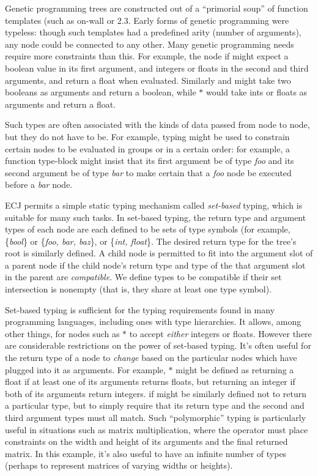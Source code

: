 \documentclass[twoside,10pt]{book}
\newcommand\lisp[1]{\textsf{#1}}
\begin{document}
Genetic programming trees are constructed out of a ``primorial soup'' of function templates (such as \lisp{on-wall} or \lisp{2.3}.  Early forms of genetic programming were typeless: though such templates had a predefined arity (number of arguments), any node could be connected to any other.  Many genetic programming needs require more constraints than this.  For example, the node \lisp{if} might expect a boolean value in its first argument, and integers or floats in the second and third arguments, and return a float when evaluated.  Similarly \lisp{and} might take two booleans as arguments and return a boolean, while \lisp{\(\ast\)} would take ints or floats as arguments and return a float.

Such types are often associated with the kinds of data passed from node to node, but they do not have to be.  For example, typing might be used to constrain certain nodes to be evaluated in groups or in a certain order: for example, a function \lisp{type-block} might insist that its first argument be of type \textit{foo} and its second argument be of type \textit{bar} to make certain that a \textit{foo} node be executed before a \textit{bar} node.

ECJ permits a simple static typing mechanism called {\it set-based} typing, which is suitable for many such tasks.  In set-based typing, the return type and argument types of each node are each defined to be  sets of type symbols (for example, \{\textit{bool}\} or \{\textit{foo, bar, baz}\}, or \{\textit{int, float}\}.  The desired return type for the tree's root is similarly defined.  A child node is permitted to fit into the argument slot of a parent node if the child node's return type and type of the that argument slot in the parent are {\it compatible}.  We define types to be compatible if their set intersection is nonempty (that is, they share at least one type symbol).

Set-based typing is sufficient for the typing requirements found in many programming languages, including ones with type hierarchies.  It allows, among other things, for nodes such as \lisp{\(\ast\)} to accept {\it either} integers or floats.  However there are considerable restrictions on the power of set-based typing.  It's often useful for the return type of a node to {\it change} based on the particular nodes which have plugged into it as arguments. For example, \lisp{\(\ast\)} might be defined as returning a float if at least one of its arguments returns floats, but returning an integer if both of its arguments return integers.  \lisp{if} might be similarly defined not to return a particular type, but to simply require that its return type and the second and third argument types must all match.  Such ``polymorphic'' typing is particularly useful in situations such as matrix multiplication, where the operator must place constraints on the width and height of its arguments and the final returned matrix.  In this example, it's also useful to have an infinite number of types (perhaps to represent matrices of varying widths or heights).
\end{document}

